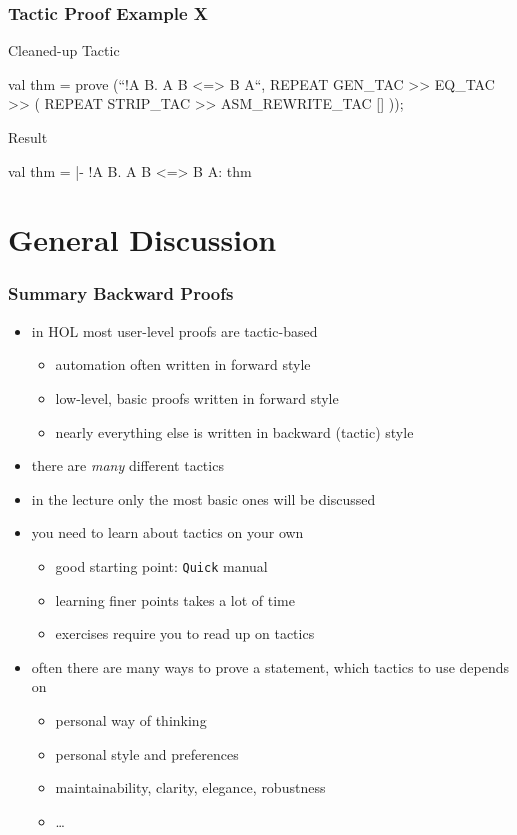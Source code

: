 \begin{frame}[fragile]
\frametitle{Tactic Proof Example X}

\begin{block}{Cleaned-up Tactic}
\begin{semiverbatim}
\scriptsize{}val thm = prove (``!A B. A \holAnd{} B <=> B \holAnd{} A``,
  REPEAT GEN_TAC >>
  EQ_TAC >> (
    REPEAT STRIP_TAC >>
    ASM_REWRITE_TAC []
  ));
\end{semiverbatim}
\end{block}

\begin{block}{Result}
\begin{semiverbatim}
\scriptsize{}val thm =
   |- !A B. A \holAnd{} B <=> B \holAnd{} A:
   thm
\end{semiverbatim}
\end{block}

\end{frame}


\section{General Discussion}

\begin{frame}
\frametitle{Summary Backward Proofs}
\begin{itemize}
\item in HOL most user-level proofs are tactic-based
\begin{itemize}
\item automation often written in forward style
\item low-level, basic proofs written in forward style
\item nearly everything else is written in backward (tactic) style
\end{itemize}
\item there are \emph{many} different tactics
\item in the lecture only the most basic ones will be discussed
\item \alert{you need to learn about tactics on your own}
\begin{itemize}
\item good starting point: \texttt{Quick} manual
\item learning finer points takes a lot of time
\item exercises require you to read up on tactics
\end{itemize}
\item often there are many ways to prove a statement, which tactics to use depends on
\begin{itemize}
\item personal way of thinking
\item personal style and preferences
\item maintainability, clarity, elegance, robustness
\item \ldots
\end{itemize}
\end{itemize}
\end{frame}

